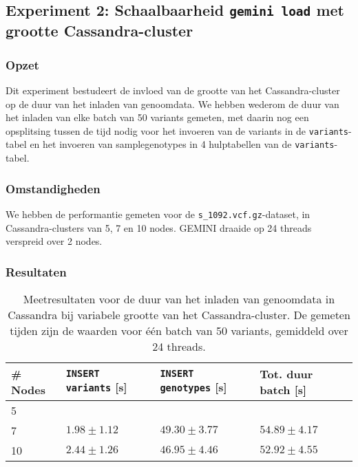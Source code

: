   
\subsection{Experiment 2: Schaalbaarheid \texttt{gemini load} met grootte Cassandra-cluster}
\label{exp2}

\subsubsection{Opzet}

Dit experiment bestudeert de invloed van de grootte van het Cassandra-cluster op de duur van het inladen van genoomdata. We hebben wederom de duur van het inladen van elke batch van 50 variants gemeten, met daarin nog een opsplitsing tussen de tijd nodig voor het invoeren van de variants in de \texttt{variants}-tabel en het invoeren van samplegenotypes in 4 hulptabellen van de \texttt{variants}-tabel.

\subsubsection{Omstandigheden}

We hebben de performantie gemeten voor de \texttt{s\_1092.vcf.gz}-dataset, in Cassandra-clusters van 5, 7 en 10 nodes. GEMINI draaide op 24 threads verspreid over 2 nodes.

\subsubsection{Resultaten}

\begin{table}[h]

\begin{tabular}{@{}llll@{}}
\cmidrule(l){1-4}
\multicolumn{1}{|l|}{\textbf{\# Nodes}}  & \multicolumn{1}{l|}{\textbf{\texttt{INSERT variants} [s]}} & \multicolumn{1}{l|}{\textbf{\texttt{INSERT genotypes} [s]}} & \multicolumn{1}{l|}{\textbf{Tot. duur batch [s]}}             \\ \midrule
\multicolumn{1}{|l|}{5} & \multicolumn{1}{l|}{$ $} & \multicolumn{1}{l|}{$ $}   & \multicolumn{1}{l|}{$ $}\\
\multicolumn{1}{|l|}{7} & \multicolumn{1}{l|}{$1.98 \pm 1.12$} & \multicolumn{1}{l|}{$49.30 \pm 3.77$}     &  \multicolumn{1}{l|}{$54.89 \pm 4.17$}  \\
\multicolumn{1}{|l|}{10} & \multicolumn{1}{l|}{$2.44 \pm 1.26$} & \multicolumn{1}{l|}{$46.95 \pm 4.46$}     &  \multicolumn{1}{l|}{$52.92 \pm 4.55$}  \\
\bottomrule
\end{tabular}
\caption{Meetresultaten voor de duur van het inladen van genoomdata in Cassandra bij variabele grootte van het Cassandra-cluster. De gemeten tijden zijn de waarden voor \'e\'en batch van 50 variants, gemiddeld over 24 threads.}
\end{table}


